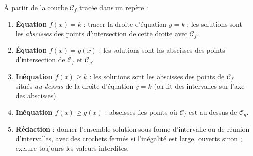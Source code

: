 \documentclass[11pt]{article}
\begin{document}
\begin{methode}
À partir de la courbe $\mathcal{C}_f$ tracée dans un repère :
\begin{enumerate}
\item \textbf{Équation $f(x)=k$} : tracer la droite d'équation $y=k$ ; les solutions sont les \emph{abscisses} des points d'intersection de cette droite avec $\mathcal{C}_f$.
\item \textbf{Équation $f(x)=g(x)$} : les solutions sont les abscisses des points d'intersection de $\mathcal{C}_f$ et $\mathcal{C}_g$.
\item \textbf{Inéquation $f(x)\geq k$} : les solutions sont les abscisses des points de $\mathcal{C}_f$ situés \emph{au-dessus} de la droite d'équation $y=k$ (on lit des intervalles sur l'axe des abscisses).
\item \textbf{Inéquation $f(x)\geq g(x)$} : abscisses des points où $\mathcal{C}_f$ est au-dessus de $\mathcal{C}_g$.
\item \textbf{Rédaction} : donner l'ensemble solution sous forme d'intervalle ou de réunion d'intervalles, avec des crochets fermés si l'inégalité est large, ouverts sinon ; exclure toujours les valeurs interdites.
\end{enumerate}
\end{methode}
\end{document}

